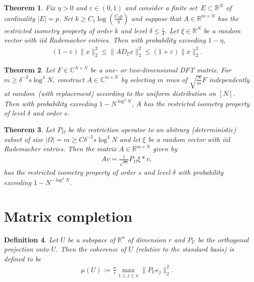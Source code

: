\documentclass[13pt]{article}
\newtheorem{thm}{Theorem}[section]
\theoremstyle{plain}
\newtheorem{defi}[thm]{Definition}
\newcommand{\R}{\mathbb{R}}
\newcommand{\C}{\mathbb{C}}
\begin{document}
\begin{thm}
    Fix $\eta > 0$ and $\varepsilon \in (0,1)$ and consider a finite set $E \subset \R^N$ of
    cardinality $|E| = p$. Set $k \ge C_1 \log\left( \frac{C_2p}{\eta} \right)$ and suppose
    that $A \in \R^{m \times N}$ has the restricted isometry property of order $k$ and level
    $\delta \le \frac{\varepsilon}{4}$. Let $\xi \in \R^N$ be a random vector with iid
    Rademacher entries. Then with probability exceeding $1 - \eta$,
    \[
        \begin{aligned}
            (1-\varepsilon)\|x\|_2^2 \le \|AD_{\xi} x\|_2^2 \le (1+\varepsilon)\|x\|_2^2.
        \end{aligned}
    \]
\end{thm}

\begin{thm}
    Let $F \in \C^{N \times N}$ be a one- or two-dimensional DFT matrix.
    For $m \ge \delta^{-2} s \log^4 N$, construct $A \in \C^{m \times N}$ by selecting
    $m$ rows of $\sqrt{\frac{N}{m}} F$ independently at random (with replacement)
    according to the uniform distribution on $[N]$.
    Then with probability exceeding $1 - N^{\log^3 N}$, $A$ has the
    restricted isometry property of level $\delta$ and order $s$.
\end{thm}

\begin{thm}
    Let $P_\Omega$ be the restriction operator to an abitrary (deterministic) subset
    of size $|\Omega| = m \ge C \delta^{-2} s\log^4 N$ and let
    $\xi$ be a random vector with iid Rademacher entries. Then the matrix $A \in \R^{m \times N}$
    given by
    \[
        \begin{aligned}
            Av = \frac{1}{\sqrt{m}} P_{\Omega} \xi \ast v,
        \end{aligned}
    \]
    has the restricted isometry property of order $s$ and level $\delta$
    with probability exceeding $1 - N^{-\log^3 N}$.
\end{thm}

\newpage

\section{Matrix completion}

\begin{defi}
    Let $U$ be a subspace of $\R^n$ of dimension $r$ and $P_U$ be the orthogonal projection onto
    $U$. Then the \emph{coherence} of $U$ (relative to the standard basis) is defined to be
    \[
        \begin{aligned}
            \mu(U) := \frac{n}{r} \max_{1 \le j \le n} \|P_U e_j\|_2^2.
        \end{aligned}
    \]
\end{defi}
\end{document}
